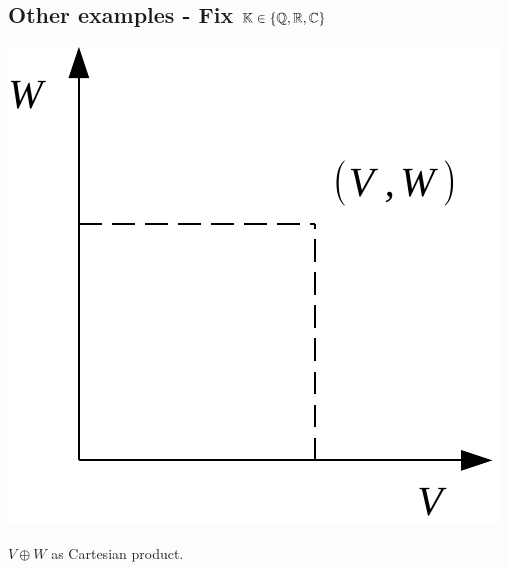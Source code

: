 \documentclass[../main.tex]{subfiles}
\begin{document}
\subsection[Other examples]{Other examples - Fix $\mathbb{K}\in\Bqty{\mathbb{Q},\mathbb{R},\mathbb{C}}$}
\begin{marginfigure}[35mm]
	\includegraphics[width=1\linewidth]{images/linear_space_group.pdf}
	\caption{$V\oplus W$ as Cartesian product.}
\end{marginfigure}
\end{document}

